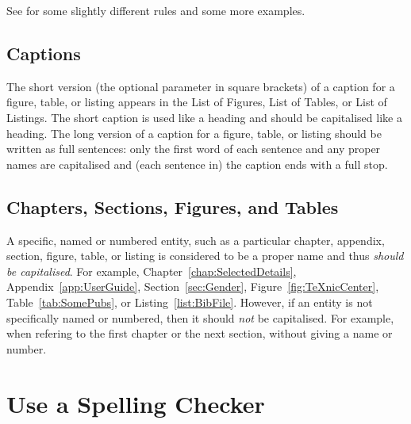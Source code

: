 See \textcite{WB-Capitalisation} for some slightly different rules and
some more examples.






\subsection{Captions}

The short version (the optional parameter in square brackets) of a
caption for a figure, table, or listing appears in the List of
Figures, List of Tables, or List of Listings. The short caption is
used like a heading and should be capitalised like a heading. The long
version of a caption for a figure, table, or listing should be written
as full sentences: only the first word of each sentence and any proper
names are capitalised and (each sentence in) the caption ends with a
full stop.



\subsection{Chapters, Sections, Figures, and Tables}

A specific, named or numbered entity, such as a particular chapter,
appendix, section, figure, table, or listing is considered to be a
proper name and thus \emph{should be capitalised}. For example,
Chapter~\ref{chap:SelectedDetails}, Appendix~\ref{app:UserGuide},
Section~\ref{sec:Gender}, Figure~\ref{fig:TeXnicCenter},
Table~\ref{tab:SomePubs}, or Listing~\ref{list:BibFile}. However, if
an entity is not specifically named or numbered, then it should
\emph{not} be capitalised. For example, when refering to the first
chapter or the next section, without giving a name or number.











\section{Use a Spelling Checker}

